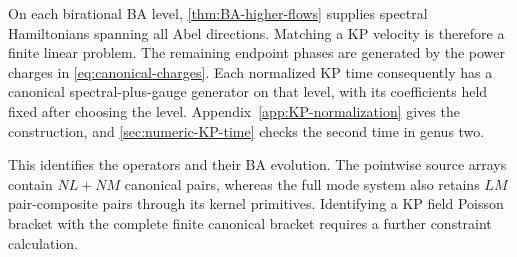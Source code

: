 On each birational BA level, \cref{thm:BA-higher-flows} supplies
spectral Hamiltonians spanning all Abel directions. Matching a KP
velocity is therefore a finite linear problem. The remaining endpoint
phases are generated by the power charges in
\cref{eq:canonical-charges}. Each normalized KP time consequently
has a canonical spectral-plus-gauge generator on that level, with
its coefficients held fixed after choosing the level.
Appendix~\ref{app:KP-normalization} gives the construction, and
\cref{sec:numeric-KP-time} checks the second time in genus two.

This identifies the operators and their BA evolution. The pointwise
source arrays contain $NL+NM$ canonical pairs, whereas the full mode
system also retains $LM$ pair-composite pairs through its kernel
primitives. Identifying a KP field Poisson bracket with the complete
finite canonical bracket requires a further constraint calculation.
